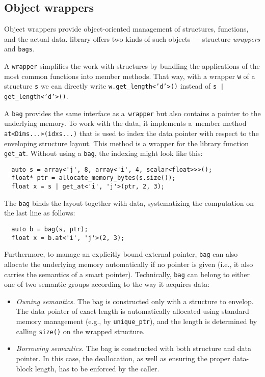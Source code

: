\subsection{Object wrappers} 

Object wrappers provide object-oriented management of structures, functions, and the actual data. \Noarr{} library offers two kinds of such objects --- structure \emph{wrappers} and \texttt{bags}.

A \texttt{wrapper} simplifies the work with structures by bundling the applications of the most common \Noarr{} functions into member methods. That way, with a wrapper \texttt{w} of a structure \texttt{s} we can directly write \texttt{w.get_length<'d'>()} instead of \texttt{s | get_length<'d'>()}.

A \texttt{bag} provides the same interface as a~\texttt{wrapper} but also contains a pointer to the underlying memory. To work with the data, it implements a~member method \texttt{at<Dims...>(idxs...)} that is used to index the data pointer with respect to the enveloping structure layout. This method is a wrapper for the library function \texttt{get\_at}. Without using a \texttt{bag}, the indexing might look like this:
\begin{verbatim}
  auto s = array<'j', 8, array<'i', 4, scalar<float>>>();
  float* ptr = allocate_memory_bytes(s.size());
  float x = s | get_at<'i', 'j'>(ptr, 2, 3);
\end{verbatim}
The \texttt{bag} binds the layout together with data, systematizing the computation on the last line as follows:
\begin{verbatim}
  auto b = bag(s, ptr);
  float x = b.at<'i', 'j'>(2, 3);
\end{verbatim}

Furthermore, to manage an explicitly bound external pointer, \texttt{bag} can also allocate the underlying memory automatically if no pointer is given (i.e., it also carries the semantics of a smart pointer). Technically, \texttt{bag} can belong to either one of two semantic groups according to the way it acquires data:
\begin{itemize}
    \item \emph{Owning semantics.} The bag is constructed only with a structure to envelop. The data pointer of exact length is automatically allocated using standard memory management (e.g., by \texttt{unique\_ptr}), and the length is determined by calling \texttt{size()} on the wrapped structure.
    \item \emph{Borrowing semantics.} The bag is constructed with both structure and data pointer. In this case, the deallocation, as well as ensuring the proper data-block length, has to be enforced by the caller.
\end{itemize}



